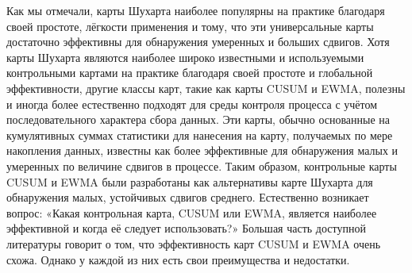 Как мы отмечали, карты Шухарта наиболее популярны на практике благодаря своей простоте, лёгкости применения и тому, что эти универсальные карты достаточно эффективны для обнаружения умеренных и больших сдвигов. Хотя карты Шухарта являются наиболее широко известными и используемыми контрольными картами на практике благодаря своей простоте и глобальной эффективности, другие классы карт, такие как карты CUSUM и EWMA, полезны и иногда более естественно подходят для среды контроля процесса с учётом последовательного характера сбора данных. Эти карты, обычно основанные на кумулятивных суммах статистики для нанесения на карту, получаемых по мере накопления данных, известны как более эффективные для обнаружения малых и умеренных по величине сдвигов в процессе. Таким образом, контрольные карты CUSUM и EWMA были разработаны как альтернативы карте Шухарта для обнаружения малых, устойчивых сдвигов среднего. Естественно возникает вопрос: «Какая контрольная карта, CUSUM или EWMA, является наиболее эффективной и когда её следует использовать?» Большая часть доступной литературы говорит о том, что эффективность карт CUSUM и EWMA очень схожа. Однако у каждой из них есть свои преимущества и недостатки.

